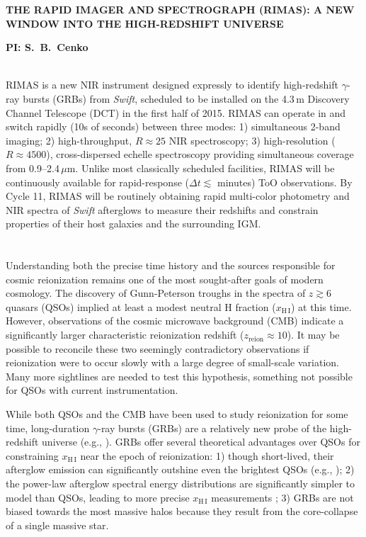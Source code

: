 \documentclass[letterpaper,11pt]{article}
\begin{document}
\pagestyle{plain}

\begin{center} 
\bfseries\uppercase{The Rapid IMAger and Spectrograph (RIMAS): A New Window
	into the High-Redshift Universe}
\end{center}
\vspace{-0.3cm}
\centerline{\bf PI: {S.~B.~Cenko}}
 
\smallskip\\
RIMAS is a new NIR instrument designed expressly to identify high-redshift 
$\gamma$-ray bursts (GRBs) from \textit{Swift}, scheduled to be installed on the 
4.3\,m Discovery Channel Telescope (DCT) in the first half of 2015. RIMAS can operate 
in and switch rapidly (10s of seconds) between three modes: 1) simultaneous 2-band 
imaging; 2) high-throughput, $R \approx 25$ NIR spectroscopy; 3) high-resolution ($R 
\approx 4500$), cross-dispersed echelle spectroscopy providing simultaneous coverage 
from 0.9--2.4\,$\mu$m.  Unlike most classically scheduled facilities, RIMAS will be 
continuously available for rapid-response ($\Delta t \lesssim$ minutes) ToO 
observations.  By Cycle 11, RIMAS will be routinely obtaining rapid multi-color 
photometry and NIR spectra of \textit{Swift} afterglows to measure their redshifts and 
constrain properties of their host galaxies and the surrounding IGM. \\

\smallskip\\
\smallskip\\
Understanding both the precise time history and the sources responsible for cosmic
reionization remains one of the most sought-after goals of modern cosmology.  The 
discovery of Gunn-Peterson troughs in the spectra of $z \gtrsim 6$ quasars 
(QSOs\cite{bfw+01}) implied at least a modest neutral H fraction 
($x_{\mathrm{H\,I}}$) at this time.  However, observations of the cosmic microwave
background (CMB\cite{hlk+13}) indicate a significantly larger characteristic reionization 
redshift ($z_\mathrm{reion} \approx 10$).  It may be 
possible to reconcile these two seemingly contradictory observations if reionization
were to occur slowly with a large degree of small-scale variation.  Many more
sightlines are needed to test this hypothesis, something not possible for QSOs
with current instrumentation.

While both QSOs and the CMB have been used to study reionization for some time, 
long-duration $\gamma$-ray bursts (GRBs) are a relatively new probe of the high-redshift 
universe (e.g., \cite{lr00}).  GRBs offer several theoretical advantages over QSOs
for constraining $x_{\mathrm{H\,I}}$ near the epoch of reionization: 1) though
short-lived, their afterglow emission can significantly outshine even the brightest
QSOs (e.g., \cite{rks+08,bpl+09,kmk07}); 2) the power-law afterglow spectral energy 
distributions are significantly simpler to model than QSOs, leading to more precise 
$x_{\mathrm{H\,I}}$ measurements \cite{mlz+08}; 3) GRBs are not biased towards 
the most massive halos\cite{mlz+08} because they result from the 
core-collapse of a single massive star.
\end{document}
